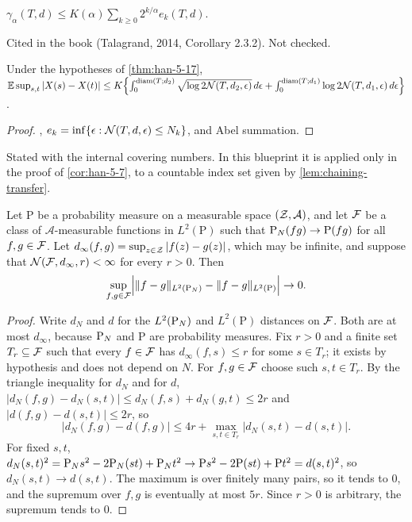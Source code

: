 \begin{lemma}
  \label{lem:han-5-7}
  $\gamma_\alpha(T,d)\le K(\alpha)\sum_{k\ge0}2^{k/\alpha}e_k(T,d)$.
\end{lemma}
\begin{remark}
  Cited in the book (Talagrand, 2014, Corollary 2.3.2). Not checked.
\end{remark}

\begin{corollary}
  \label{cor:han-5-6}
  Under the hypotheses of \cref{thm:han-5-17}, $\mathbb{E}\sup_{s,t}|X(s)-X(t)|\le K\Bigl\{\int_0^{\operatorname{diam}(T;d_2)}\sqrt{\log2\mathcal{N}(T,d_2,\epsilon)}\,d\epsilon+\int_0^{\operatorname{diam}(T;d_1)}\log2\mathcal{N}(T,d_1,\epsilon)\,d\epsilon\Bigr\}$.
\end{corollary}
\begin{proof}
  , $e_k=\inf\{\epsilon:\mathcal{N}(T,d,\epsilon)\le N_k\}$, and Abel summation.
\end{proof}
\begin{remark}
  Stated with the internal covering numbers. In this blueprint it is applied only in the proof of \cref{cor:han-5-7}, to a countable index set given by \cref{lem:chaining-transfer}.
\end{remark}

\begin{lemma}
  \label{lem:fixed-net-distances}
  Let $\mathrm P$ be a probability measure on a measurable space $(\mathcal{Z},\mathcal A)$, and let $\mathcal{F}$ be a class of $\mathcal A$-measurable functions in $L^2(\mathrm P)$ such that $\mathrm{P}_N(fg)\to\mathrm P(fg)$ for all $f,g\in\mathcal{F}$. Let $d_\infty(f,g)=\sup_{z\in\mathcal{Z}}|f(z)-g(z)|$, which may be infinite, and suppose that $\mathcal{N}(\mathcal{F},d_\infty,r)<\infty$ for every $r>0$. Then
  \[
    \sup_{f,g\in\mathcal{F}}\Bigl|\|f-g\|_{L^2(\mathrm{P}_N)}-\|f-g\|_{L^2(\mathrm P)}\Bigr|\to0.
  \]
\end{lemma}
\begin{proof}
  Write $d_N$ and $d$ for the $L^2(\mathrm{P}_N)$ and $L^2(\mathrm P)$ distances on $\mathcal{F}$. Both are at most $d_\infty$, because $\mathrm{P}_N$ and $\mathrm P$ are probability measures. Fix $r>0$ and a finite set $T_r\subseteq\mathcal{F}$ such that every $f\in\mathcal{F}$ has $d_\infty(f,s)\le r$ for some $s\in T_r$; it exists by hypothesis and does not depend on $N$. For $f,g\in\mathcal{F}$ choose such $s,t\in T_r$. By the triangle inequality for $d_N$ and for $d$, $|d_N(f,g)-d_N(s,t)|\le d_N(f,s)+d_N(g,t)\le2r$ and $|d(f,g)-d(s,t)|\le2r$, so
  \[
    |d_N(f,g)-d(f,g)|\le4r+\max_{s,t\in T_r}|d_N(s,t)-d(s,t)|.
  \]
  For fixed $s,t$, $d_N(s,t)^2=\mathrm{P}_N s^2-2\mathrm{P}_N(st)+\mathrm{P}_N t^2\to\mathrm Ps^2-2\mathrm P(st)+\mathrm Pt^2=d(s,t)^2$, so $d_N(s,t)\to d(s,t)$. The maximum is over finitely many pairs, so it tends to $0$, and the supremum over $f,g$ is eventually at most $5r$. Since $r>0$ is arbitrary, the supremum tends to $0$.
\end{proof}

